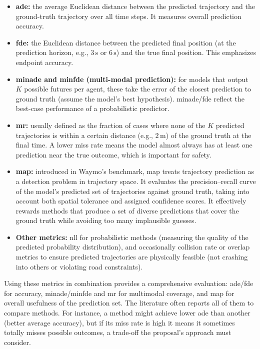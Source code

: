 \begin{itemize}
    \item \textbf{\acf{ade}:} the average Euclidean distance between the predicted trajectory and the ground-truth trajectory over all time steps. It measures overall prediction accuracy.
    \item \textbf{\acf{fde}:} the Euclidean distance between the predicted final position (at the prediction horizon, e.g., \(3\,\mathrm{s}\) or \(6\,\mathrm{s}\)) and the true final position. This emphasizes endpoint accuracy.
    \item \textbf{min\acs{ade} and min\acs{fde} (multi-modal prediction):} for models that output \(K\) possible futures per agent, these take the error of the closest prediction to ground truth (assume the model’s best hypothesis). min\acs{ade}/\acs{fde} reflect the best-case performance of a probabilistic predictor.
    \item \textbf{\acf{mr}:} usually defined as the fraction of cases where none of the \(K\) predicted trajectories is within a certain distance (e.g., \(2\,\mathrm{m}\)) of the ground truth at the final time. A lower miss rate means the model almost always has at least one prediction near the true outcome, which is important for safety.
    \item \textbf{\Acf{map}:} introduced in Waymo’s benchmark, \ac{map} treats trajectory prediction as a detection problem in trajectory space. It evaluates the precision–recall curve of the model’s predicted set of trajectories against ground truth, taking into account both spatial tolerance and assigned confidence scores. It effectively rewards methods that produce a set of diverse predictions that cover the ground truth while avoiding too many implausible guesses.
    \item \textbf{Other metrics:} \acf{nll} for probabilistic methods (measuring the quality of the predicted probability distribution), and occasionally collision rate or overlap metrics to ensure predicted trajectories are physically feasible (not crashing into others or violating road constraints).
\end{itemize}

Using these metrics in combination provides a comprehensive evaluation: \ac{ade}/\ac{fde} for accuracy, min\ac{ade}/min\ac{fde} and \ac{mr} for multimodal coverage, and \ac{map} for overall usefulness of the prediction set. The literature often reports all of them to compare methods. For instance, a method might achieve lower \ac{ade} than another (better average accuracy), but if its miss rate is high it means it sometimes totally misses possible outcomes, a trade-off the proposal’s approach must consider.


